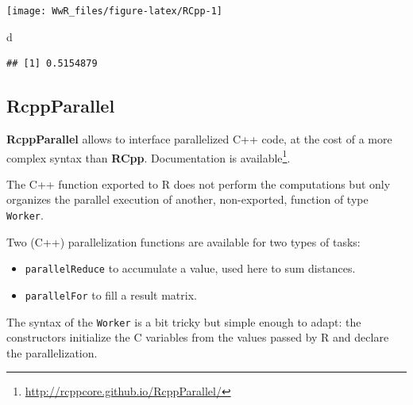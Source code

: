 \documentclass[
  12pt,
  american,
  a4paper,
  extrafontsizes,onecolumn,openright
  ]{memoir}
\newenvironment{Shaded}{\begin{snugshade}}{\end{snugshade}}
\newcommand{\NormalTok}[1]{#1}
\providecommand{\tightlist}{%
  \setlength{\itemsep}{0pt}\setlength{\parskip}{0pt}}
\newlength{\rf}
\begin{document}
\begin{center}\texttt{[image: WwR\_files/figure-latex/RCpp-1]} \end{center}

\begin{Shaded}
\begin{Highlighting}[]
\NormalTok{d}
\end{Highlighting}
\end{Shaded}

\begin{verbatim}
## [1] 0.5154879
\end{verbatim}

\normalsize

\subsection{RcppParallel}\label{rcppparallel}

\textbf{RcppParallel} allows to interface parallelized C++ code, at the cost of a more complex syntax than \textbf{RCpp}.
Documentation is available\footnote{\url{http://rcppcore.github.io/RcppParallel/}}.

The C++ function exported to R does not perform the computations but only organizes the parallel execution of another, non-exported, function of type \texttt{Worker}.

Two (C++) parallelization functions are available for two types of tasks:

\begin{itemize}
\tightlist
\item
  \texttt{parallelReduce} to accumulate a value, used here to sum distances.
\item
  \texttt{parallelFor} to fill a result matrix.
\end{itemize}

The syntax of the \texttt{Worker} is a bit tricky but simple enough to adapt: the constructors initialize the C variables from the values passed by R and declare the parallelization.

\scriptsize
\end{document}
